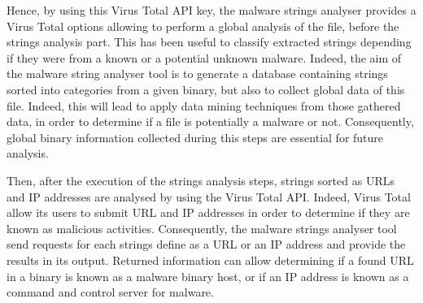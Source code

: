 Hence, by using this Virus Total API key, the malware strings analyser provides a Virus Total options allowing to perform a global analysis of the file, before the strings analysis part.
This has been useful to classify extracted strings depending if they were from a known or a 
potential unknown malware.
Indeed, the aim of the malware string analyser tool is to generate a database containing 
strings sorted into categories from a given binary, but also to collect global data of this file.
Indeed, this will lead to apply data mining techniques from those gathered data, in order to
determine if a file is potentially a malware or not. Consequently, global binary information
collected during this steps are essential for future analysis.

Then, after the execution of the strings analysis steps, strings sorted as URLs and IP addresses
are analysed by using the Virus Total API. Indeed, Virus Total allow its users to submit
URL and IP addresses in order to determine if they are known as malicious activities.
Consequently, the malware strings analyser tool send requests for each strings define
as a URL or an IP address and provide the results in its output.
Returned information can allow determining if a found URL in a binary is known as a malware
binary host, or if an IP address is known as a command and control server for malware.
